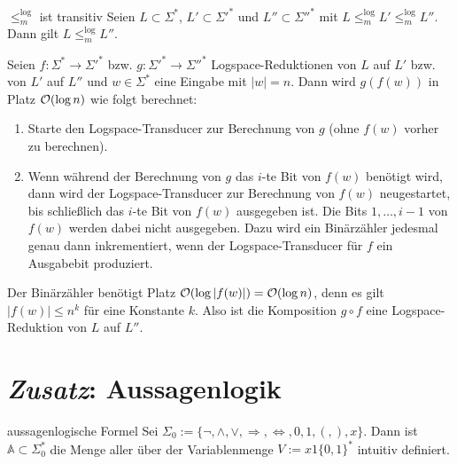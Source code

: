 \begin{Satz}{$\le_m^{\log}$ ist transitiv}
    Seien $L \subset \Sigma^\ast$, $L' \subset \Sigma'^\ast$ und $L'' \subset \Sigma''^\ast$
    mit $L \le_m^{\log} L' \le_m^{\log} L''$.\\
    Dann gilt $L \le_m^{\log} L''$.
\end{Satz}

\begin{Beweis}
    Seien $f\colon \Sigma^\ast \rightarrow \Sigma'^\ast$ bzw.
    $g\colon \Sigma'^\ast \rightarrow \Sigma''^\ast$ Logspace-Reduktionen von $L$ auf $L'$
    bzw. von $L'$ auf $L''$ und $w \in \Sigma^\ast$ eine Eingabe mit $|w| = n$.
    Dann wird $g(f(w))$ in Platz $\mathcal{O}(\log n)$ wie folgt berechnet:
    \begin{enumerate}
        \item
        Starte den Logspace-Transducer zur Berechnung von $g$ (ohne $f(w)$ vorher zu berechnen).

        \item
        Wenn während der Berechnung von $g$ das $i$-te Bit von $f(w)$ benötigt wird,
        dann wird der Logspace-Transducer zur Berechnung von $f(w)$ neugestartet,
        bis schließlich das $i$-te Bit von $f(w)$ ausgegeben ist.
        Die Bits $1, \dotsc, i - 1$ von $f(w)$ werden dabei nicht ausgegeben.
        Dazu wird ein Binärzähler jedesmal genau dann inkrementiert, wenn
        der Logspace-Transducer für $f$ ein Ausgabebit produziert.
    \end{enumerate}
    Der Binärzähler benötigt Platz $\mathcal{O}(\log |f(w)|) = \mathcal{O}(\log n)$,
    denn es gilt $|f(w)| \le n^k$ für eine Konstante $k$.
    Also ist die Komposition $g \circ f$ eine Logspace-Reduktion von $L$ auf $L''$.
\end{Beweis}

\pagebreak

\section{%
    \emph{Zusatz}: Aussagenlogik%
}

\begin{Def}{aussagenlogische Formel}
    Sei $\Sigma_0 := \{\lnot, \land, \lor, \Rightarrow, \Leftrightarrow, 0, 1,
    (, ), x\}$.
    Dann ist $\mathbb{A} \subset \Sigma_0^\ast$ die Menge aller 
    über der Variablenmenge $V := x1\{0, 1\}^\ast$ intuitiv definiert.
\end{Def}

